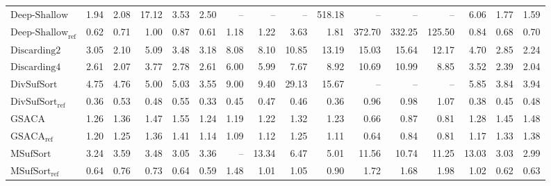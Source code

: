 \begin{table}
{\begin{tabular}{lrrrrrrrrrrrrrrr}
    $\text{Deep-Shallow}$ & 1.94 & 2.08 & {\color{red}17.12} & 3.53 & 2.50 & {\color{darkgray}--} & {\color{darkgray}--} & {\color{darkgray}--} & {\color{red}518.18} & {\color{darkgray}--} & {\color{darkgray}--} & {\color{darkgray}--} & 6.06 & 1.77 & 1.59 \\
    $\text{Deep-Shallow}_{\text{ref}}$ & 0.62 & 0.71 & 1.00 & 0.87 & 0.61 & 1.18 & 1.22 & 3.63 & 1.81 & {\color{red}372.70} & {\color{red}332.25} & {\color{red}125.50} & 0.84 & 0.68 & 0.70 \\
    $\text{Discarding2}$ & 3.05 & 2.10 & 5.09 & 3.48 & 3.18 & {\color{red}8.08} & 8.10 & 10.85 & 13.19 & {\color{red}15.03} & {\color{red}15.64} & {\color{red}12.17} & 4.70 & 2.85 & 2.24 \\
    $\text{Discarding4}$ & 2.61 & 2.07 & 3.77 & 2.78 & 2.61 & 6.00 & 5.99 & 7.67 & 8.92 & 10.69 & 10.99 & 8.85 & 3.52 & 2.39 & 2.04 \\
    $\text{DivSufSort}$ & {\color{red}4.75} & {\color{red}4.76} & 5.00 & 5.03 & 3.55 & {\color{red}9.00} & {\color{red}9.40} & {\color{red}29.13} & {\color{red}15.67} & {\color{darkgray}--} & {\color{darkgray}--} & {\color{darkgray}--} & 5.85 & 3.84 & 3.94 \\
    $\text{DivSufSort}_{\text{ref}}$ & {\color{green!60!black}0.36} & {\color{green!60!black}0.53} & {\color{green!60!black}0.48} & {\color{green!60!black}0.55} & {\color{green!60!black}0.33} & {\color{green!60!black}0.45} & {\color{green!60!black}0.47} & {\color{green!60!black}0.46} & {\color{green!60!black}0.36} & 0.96 & 0.98 & 1.07 & {\color{green!60!black}0.38} & {\color{green!60!black}0.45} & {\color{green!60!black}0.48} \\
    $\text{GSACA}$ & 1.26 & 1.36 & 1.47 & 1.55 & 1.24 & 1.19 & 1.22 & 1.32 & 1.23 & {\color{green!60!black}0.66} & {\color{green!60!black}0.87} & {\color{green!60!black}0.81} & 1.28 & 1.45 & 1.48 \\
    $\text{GSACA}_{\text{ref}}$ & 1.20 & 1.25 & 1.36 & 1.41 & 1.14 & 1.09 & 1.12 & 1.25 & 1.11 & {\color{green!60!black}0.64} & {\color{green!60!black}0.84} & {\color{green!60!black}0.81} & 1.17 & 1.33 & 1.38 \\
    $\text{MSufSort}$ & 3.24 & 3.59 & 3.48 & 3.05 & 3.36 & {\color{darkgray}--} & {\color{red}13.34} & 6.47 & 5.01 & {\color{red}11.56} & 10.74 & 11.25 & {\color{red}13.03} & 3.03 & 2.99 \\
    $\text{MSufSort}_{\text{ref}}$ & 0.64 & 0.76 & 0.73 & 0.64 & 0.59 & 1.48 & 1.01 & 1.05 & 0.90 & 1.72 & 1.68 & 1.98 & 1.02 & 0.62 & 0.63 \\

\end{tabular}}
\end{table}
